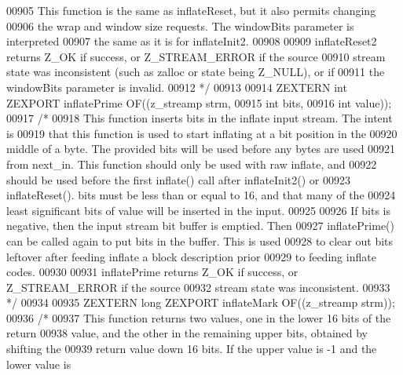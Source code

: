 \begin{DoxyCode}
00905 \textcolor{comment}{     This function is the same as inflateReset, but it also permits changing}
00906 \textcolor{comment}{   the wrap and window size requests.  The windowBits parameter is interpreted}
00907 \textcolor{comment}{   the same as it is for inflateInit2.}
00908 \textcolor{comment}{}
00909 \textcolor{comment}{     inflateReset2 returns Z\_OK if success, or Z\_STREAM\_ERROR if the source}
00910 \textcolor{comment}{   stream state was inconsistent (such as zalloc or state being Z\_NULL), or if}
00911 \textcolor{comment}{   the windowBits parameter is invalid.}
00912 \textcolor{comment}{*/}
00913 
00914 ZEXTERN \textcolor{keywordtype}{int} ZEXPORT inflatePrime OF((z\_streamp strm,
00915                                      \textcolor{keywordtype}{int} bits,
00916                                      \textcolor{keywordtype}{int} value));
00917 \textcolor{comment}{/*}
00918 \textcolor{comment}{     This function inserts bits in the inflate input stream.  The intent is}
00919 \textcolor{comment}{   that this function is used to start inflating at a bit position in the}
00920 \textcolor{comment}{   middle of a byte.  The provided bits will be used before any bytes are used}
00921 \textcolor{comment}{   from next\_in.  This function should only be used with raw inflate, and}
00922 \textcolor{comment}{   should be used before the first inflate() call after inflateInit2() or}
00923 \textcolor{comment}{   inflateReset().  bits must be less than or equal to 16, and that many of the}
00924 \textcolor{comment}{   least significant bits of value will be inserted in the input.}
00925 \textcolor{comment}{}
00926 \textcolor{comment}{     If bits is negative, then the input stream bit buffer is emptied.  Then}
00927 \textcolor{comment}{   inflatePrime() can be called again to put bits in the buffer.  This is used}
00928 \textcolor{comment}{   to clear out bits leftover after feeding inflate a block description prior}
00929 \textcolor{comment}{   to feeding inflate codes.}
00930 \textcolor{comment}{}
00931 \textcolor{comment}{     inflatePrime returns Z\_OK if success, or Z\_STREAM\_ERROR if the source}
00932 \textcolor{comment}{   stream state was inconsistent.}
00933 \textcolor{comment}{*/}
00934 
00935 ZEXTERN \textcolor{keywordtype}{long} ZEXPORT inflateMark OF((z\_streamp strm));
00936 \textcolor{comment}{/*}
00937 \textcolor{comment}{     This function returns two values, one in the lower 16 bits of the return}
00938 \textcolor{comment}{   value, and the other in the remaining upper bits, obtained by shifting the}
00939 \textcolor{comment}{   return value down 16 bits.  If the upper value is -1 and the lower value is}

\end{DoxyCode}
